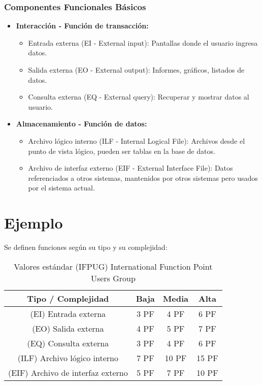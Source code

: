 \documentclass{article}
\begin{document}
\subsubsection{Componentes Funcionales Básicos}
\begin{itemize}
    \item \textbf{Interacción - Función de transacción:}
    \begin{itemize}
        \item Entrada externa (EI - External input): Pantallas donde el usuario ingresa datos.
        \item Salida externa (EO - External output): Informes, gráficos, listados de datos.
        \item Consulta externa (EQ - External query): Recuperar y mostrar datos al usuario.
    \end{itemize}
    \item \textbf{Almacenamiento - Función de datos:}
    \begin{itemize}
        \item Archivo lógico interno (ILF - Internal Logical File): Archivos desde el punto de vista lógico, pueden ser tablas en la base de datos.
        \item Archivo de interfaz externo (EIF - External Interface File): Datos referenciados a otros sistemas, mantenidos por otros sistemas pero usados por el sistema actual.
    \end{itemize}
\end{itemize}


\section{Ejemplo}
Se definen funciones según su tipo y su complejidad:

\begin{table}[h!]
    \centering
    \begin{tabular}{|c|c|c|c|}
        \hline
        Tipo / Complejidad & Baja & Media & Alta \\
        \hline
        (EI) Entrada externa & 3 PF & 4 PF & 6 PF \\
        (EO) Salida externa & 4 PF & 5 PF & 7 PF \\
        (EQ) Consulta externa & 3 PF & 4 PF & 6 PF \\
        (ILF) Archivo lógico interno & 7 PF & 10 PF & 15 PF \\
        (EIF) Archivo de interfaz externo & 5 PF & 7 PF & 10 PF \\
        \hline
    \end{tabular}
    \caption{Valores estándar (IFPUG) International Function Point Users Group}
\end{table}
\end{document}
